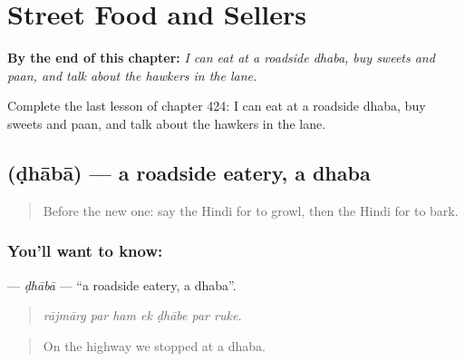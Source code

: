 
\chapter{Street Food and Sellers}
\label{ch:hi-street-food-and-sellers}

\begin{chapteropening}
\textbf{By the end of this chapter:} \emph{I can eat at a roadside dhaba, buy sweets and paan, and talk about the hawkers in the lane.}

Complete the last lesson of chapter 424: I can eat at a roadside dhaba, buy sweets and paan, and talk about the hawkers in the lane.
\end{chapteropening}

\section[\texorpdfstring{\hi{ढाबा} (ḍhābā)}{ढाबा (ḍhābā)}]{ (ḍhābā) — a roadside eatery, a dhaba}

\label{lesson:HI-C424-dhaba}



\begin{quote}
Before the new one: say the Hindi for to growl, then the Hindi for to bark.
\end{quote}

\subsection*{You'll want to know: }
\textbf{} — \emph{ḍhābā} — \textquotedblleft{}a roadside eatery, a dhaba\textquotedblright{}.

\begin{quote}
      
\end{quote}

\begin{quote}
\emph{rājmārg par ham ek ḍhābe par ruke.}
\end{quote}

\begin{quote}
On the highway we stopped at a dhaba.
\end{quote}

